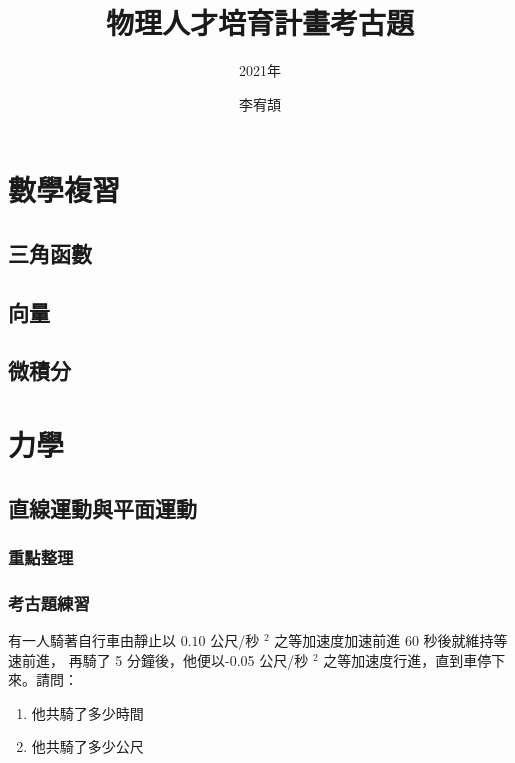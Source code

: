 \documentclass[cn,10pt,math=newtx,chinesefont=founder]{../elegantbook}
\title{物理人才培育計畫考古題}
\subtitle{2021年}
\author{李宥頡}
\institute{National Taiwan University}
\begin{document}
\maketitle

\mainmatter

\chapter{數學複習}
\section{三角函數}
\newpage
\section{向量}
\newpage
\section{微積分}
\newpage
\chapter{力學}

\section{直線運動與平面運動}
\subsection{重點整理}
\newpage
\subsection{考古題練習}
\begin{example}
    有一人騎著自行車由靜止以 $0.10$ 公尺/秒 $^{2}$ 之等加速度加速前進 60 秒後就維持等速前進，
    再騎了 5 分鐘後，他便以-0.05 公尺/秒 $^{2}$ 之等加速度行進，直到車停下來。請問：
    \begin{enumerate}[label=(\alph*)]
        \item 他共騎了多少時間
        \item 他共騎了多少公尺
    \end{enumerate}
\end{example}
\begin{solution}
\end{solution}
\vspace{7cm}
\end{document}
